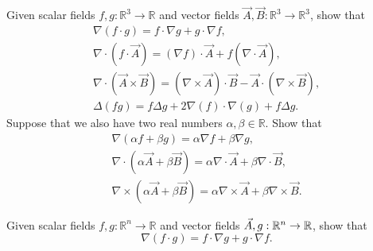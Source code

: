\documentclass[11pt]{article}
\begin{document}
\begin{exercise}
	Given scalar fields $f, g : \mathbb{R}^3 \to \mathbb{R}$ and vector fields $\vec{A}, \vec{B} : \mathbb{R}^3 \to \mathbb{R}^3$,
    show that 
    \begin{gather*}
        \nabla\left( f \cdot g \right)
        = 
        f \cdot \nabla g
        +
        g \cdot \nabla f
        ,
        \\
        \nabla\cdot\left( f \cdot \vec{A} \right)
        = 
        ( \nabla f ) \cdot \vec{A}
        +
        f ( \nabla \cdot \vec{A} )
        ,
        \\ 
        \nabla\cdot\left( \vec{A} \times \vec{B} \right)
        = 
        \left( \nabla\times\vec{A} \right) \cdot \vec{B}
        -
        \vec{A} \cdot \left( \nabla\times\vec{B} \right)
        ,
        \\ 
        \Delta ( f g )
        = 
        f \Delta g + 2 \nabla(f) \cdot \nabla( g ) + f \Delta g
        .
    \end{gather*}
    Suppose that we also have two real numbers $\alpha, \beta \in \mathbb R$.
    Show that 
    \begin{gather*}
        \nabla( \alpha f + \beta g )
        = 
        \alpha \nabla f + \beta \nabla g
        ,
        \\ 
        \nabla\cdot ( \alpha \vec{A} + \beta \vec{B} )
        = 
        \alpha \nabla\cdot \vec{A} + \beta \nabla\cdot \vec{B}
        ,
        \\ 
        \nabla\times ( \alpha \vec{A} + \beta \vec{B} )
        = 
        \alpha \nabla\times \vec{A} + \beta \nabla\times \vec{B}
        .
    \end{gather*}
\end{exercise}

\begin{solution}
    Given scalar fields $f, g : \mathbb{R}^n \to \mathbb{R}$ and vector fields $\vec{A}, g : \mathbb{R}^n \to \mathbb{R}$,
    show that 
    \[
        \nabla\left( f \cdot g \right)
        = 
        f \cdot \nabla g
        +
        g \cdot \nabla f
        .
    \]
\end{solution}
\end{document}
